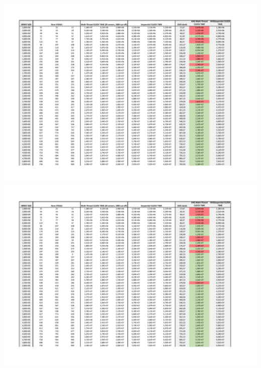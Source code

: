\documentclass{article}
\begin{document}
\begingroup
\centering
\hspace*{-1.6in}
\includegraphics[page=1, width=1.6\linewidth]{imgs/steals+multithreadVSseq.pdf}
\newpage
\hspace*{-1.6in}
\includegraphics[page=2, width=1.6\linewidth]{imgs/steals+multithreadVSseq.pdf}%
\endgroup


%
		
		
		
		
		
	
\end{document}

